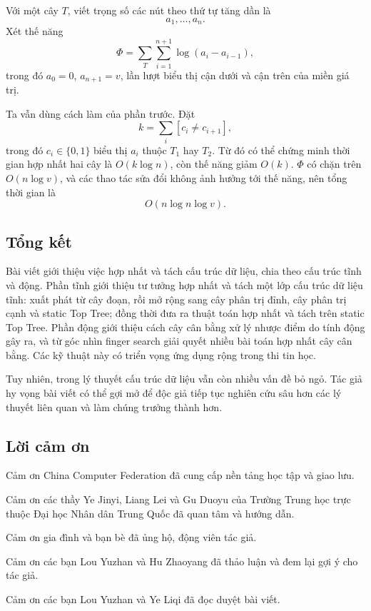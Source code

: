 \documentclass[11pt]{article}
\begin{document}
Với một cây \(T\), viết trọng số các nút theo thứ tự tăng dần là
\[
  a_1,\ldots,a_n.
\]
Xét thế năng
\[
  \Phi=\sum_T\sum_{i=1}^{n+1}\log(a_i-a_{i-1}),
\]
trong đó \(a_0=0\), \(a_{n+1}=v\), lần lượt biểu thị cận dưới và cận trên của
miền giá trị.

Ta vẫn dùng cách làm của phần trước. Đặt
\[
  k=\sum_i [c_i\ne c_{i+1}],
\]
trong đó \(c_i\in\{0,1\}\) biểu thị \(a_i\) thuộc \(T_1\) hay \(T_2\). Từ đó có
thể chứng minh thời gian hợp nhất hai cây là \(O(k\log n)\), còn thế năng giảm
\(O(k)\). \(\Phi\) có chặn trên \(O(n\log v)\), và các thao tác sửa đổi không
ảnh hưởng tới thế năng, nên tổng thời gian là
\[
  O(n\log n\log v).
\]

\subsection*{Tổng kết}

Bài viết giới thiệu việc hợp nhất và tách cấu trúc dữ liệu, chia theo cấu trúc
tĩnh và động. Phần tĩnh giới thiệu tư tưởng hợp nhất và tách một lớp cấu trúc
dữ liệu tĩnh: xuất phát từ cây đoạn, rồi mở rộng sang cây phân trị đỉnh, cây
phân trị cạnh và static Top Tree; đồng thời đưa ra thuật toán hợp nhất và tách
trên static Top Tree. Phần động giới thiệu cách cây cân bằng xử lý nhược điểm
do tính động gây ra, và từ góc nhìn finger search giải quyết nhiều bài toán hợp
nhất cây cân bằng. Các kỹ thuật này có triển vọng ứng dụng rộng trong thi tin
học.

Tuy nhiên, trong lý thuyết cấu trúc dữ liệu vẫn còn nhiều vấn đề bỏ ngỏ. Tác
giả hy vọng bài viết có thể gợi mở để độc giả tiếp tục nghiên cứu sâu hơn các
lý thuyết liên quan và làm chúng trưởng thành hơn.

\subsection*{Lời cảm ơn}

Cảm ơn China Computer Federation đã cung cấp nền tảng học tập và giao lưu.

Cảm ơn các thầy Ye Jinyi, Liang Lei và Gu Duoyu của Trường Trung học trực thuộc
Đại học Nhân dân Trung Quốc đã quan tâm và hướng dẫn.

Cảm ơn gia đình và bạn bè đã ủng hộ, động viên tác giả.

Cảm ơn các bạn Lou Yuzhan và Hu Zhaoyang đã thảo luận và đem lại gợi ý cho tác
giả.

Cảm ơn các bạn Lou Yuzhan và Ye Liqi đã đọc duyệt bài viết.
\end{document}
